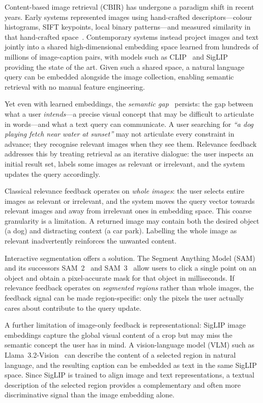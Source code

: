 \documentclass[12pt,a4paper]{article}
\begin{document}
Content-based image retrieval (CBIR) has undergone a paradigm shift in recent
years. Early systems represented images using hand-crafted descriptors—colour
histograms, SIFT keypoints, local binary patterns—and measured similarity in
that hand-crafted space~\citep{Smeulders2000}. Contemporary systems instead
project images and text jointly into a shared high-dimensional embedding space
learned from hundreds of millions of image-caption pairs, with models such as
CLIP~\citep{Radford2021} and SigLIP~\citep{Zhai2023} providing the state of
the art. Given such a shared space, a natural language query can be embedded
alongside the image collection, enabling semantic retrieval with no manual
feature engineering.

Yet even with learned embeddings, the \emph{semantic gap}~\citep{Smeulders2000}
persists: the gap between what a user \emph{intends}—a precise visual concept
that may be difficult to articulate in words—and what a text query can
communicate. A user searching for \emph{``a dog playing fetch near water at
sunset''} may not articulate every constraint in advance; they recognise
relevant images when they see them. Relevance feedback~\citep{Rocchio1971}
addresses this by treating retrieval as an iterative dialogue: the user
inspects an initial result set, labels some images as relevant or irrelevant,
and the system updates the query accordingly.

Classical relevance feedback operates on \emph{whole images}: the user selects
entire images as relevant or irrelevant, and the system moves the query vector
towards relevant images and away from irrelevant ones in embedding space.
This coarse granularity is a limitation. A returned image may contain both
the desired object (a dog) and distracting context (a car park). Labelling
the whole image as relevant inadvertently reinforces the unwanted content.

Interactive segmentation offers a solution. The Segment Anything Model
(SAM)~\citep{Kirillov2023} and its successors SAM~2~\citep{Ravi2024} and
SAM~3~\citep{Meta2025} allow users to click a single point on an object and
obtain a pixel-accurate mask for that object in milliseconds.
If relevance feedback operates on \emph{segmented regions} rather than
whole images, the feedback signal can be made region-specific: only the
pixels the user actually cares about contribute to the query update.

A further limitation of image-only feedback is representational: SigLIP image
embeddings capture the global visual content of a crop but may miss the
semantic concept the user has in mind. A vision-language model (VLM) such as
Llama~3.2-Vision~\citep{Meta2024} can describe the content of a selected
region in natural language, and the resulting caption can be embedded as text
in the same SigLIP space. Since SigLIP is trained to align image and text
representations, a textual description of the selected region provides a
complementary and often more discriminative signal than the image embedding
alone.
\end{document}
